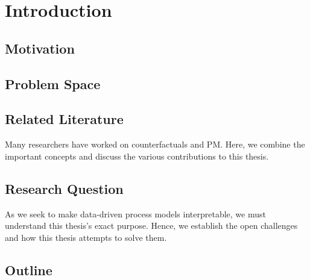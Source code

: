 \documentclass[12pt,a4paper]{report}
\begin{document}




\tableofcontents
\printglossary[type=acronym, title=List of terms, toctitle=List of terms]


\chapter{Introduction}
\label{sec:intro}

\section{Motivation}
\label{sec:motivation}


\section{Problem Space}
\label{sec:challenges}


% 

\section{Related Literature}
\label{sec:literature}
Many researchers have worked on counterfactuals and \Gls{PM}. Here, we combine the important concepts and discuss the various contributions to this thesis.



\section{Research Question}
\label{sec:rq}
As we seek to make data-driven process models interpretable, we must understand this thesis's exact purpose. Hence, we establish the open challenges and how this thesis attempts to solve them. 


\section{Outline}

\end{document}
